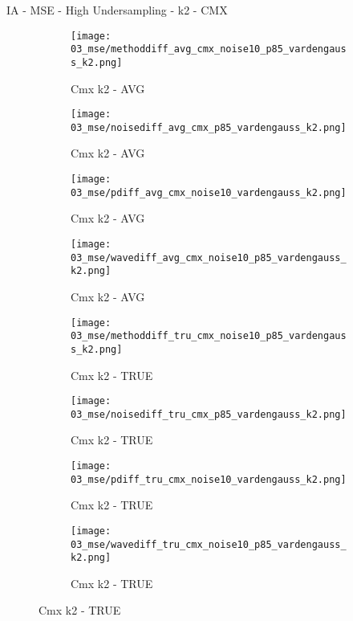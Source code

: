 \documentclass{beamer}
\begin{document}
\begin{frame}{IA - MSE - High Undersampling - k2 - CMX}{}
\begin{figure}
\begin{subfigure}{0.24\textwidth}
\texttt{[image: 03\_mse/methoddiff\_avg\_cmx\_noise10\_p85\_vardengauss\_k2.png]}
\vspace{-20pt}
\caption*{\tiny Cmx k2 - AVG}
\end{subfigure}
\begin{subfigure}{0.24\textwidth}
\texttt{[image: 03\_mse/noisediff\_avg\_cmx\_p85\_vardengauss\_k2.png]}
\vspace{-20pt}
\caption*{\tiny Cmx k2 - AVG}
\end{subfigure}
\begin{subfigure}{0.24\textwidth}
\texttt{[image: 03\_mse/pdiff\_avg\_cmx\_noise10\_vardengauss\_k2.png]}
\vspace{-20pt}
\caption*{\tiny Cmx k2 - AVG}
\end{subfigure}
\begin{subfigure}{0.24\textwidth}
\texttt{[image: 03\_mse/wavediff\_avg\_cmx\_noise10\_p85\_vardengauss\_k2.png]}
\vspace{-20pt}
\caption*{\tiny Cmx k2 - AVG}
\end{subfigure}

\begin{subfigure}{0.24\textwidth}
\texttt{[image: 03\_mse/methoddiff\_tru\_cmx\_noise10\_p85\_vardengauss\_k2.png]}
\vspace{-20pt}
\caption*{\tiny Cmx k2 - TRUE}
\end{subfigure}
\begin{subfigure}{0.24\textwidth}
\texttt{[image: 03\_mse/noisediff\_tru\_cmx\_p85\_vardengauss\_k2.png]}
\vspace{-20pt}
\caption*{\tiny Cmx k2 - TRUE}
\end{subfigure}
\begin{subfigure}{0.24\textwidth}
\texttt{[image: 03\_mse/pdiff\_tru\_cmx\_noise10\_vardengauss\_k2.png]}
\vspace{-20pt}
\caption*{\tiny Cmx k2 - TRUE}
\end{subfigure}
\begin{subfigure}{0.24\textwidth}
\texttt{[image: 03\_mse/wavediff\_tru\_cmx\_noise10\_p85\_vardengauss\_k2.png]}
\vspace{-20pt}
\caption*{\tiny Cmx k2 - TRUE}
\end{subfigure}
\end{figure}
\end{frame}
\end{document}
